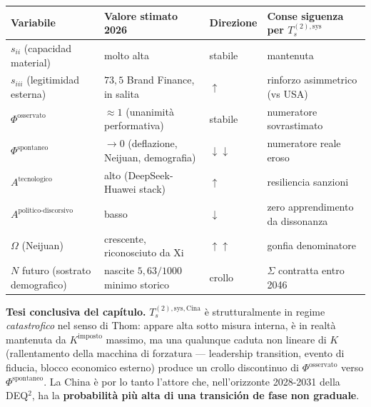 {\def\LTcaptype{none} %
{\small\begin{longtable}[]{@{}
  >{\raggedright\arraybackslash}p{}
  >{\raggedright\arraybackslash}p{}
  >{\raggedright\arraybackslash}p{}
  >{\raggedright\arraybackslash}p{}@{}}
\toprule\noalign{}
\begin{minipage}[b]{\linewidth}\raggedright
Variabile
\end{minipage} & \begin{minipage}[b]{\linewidth}\raggedright
Valore stimato 2026
\end{minipage} & \begin{minipage}[b]{\linewidth}\raggedright
Direzione
\end{minipage} & \begin{minipage}[b]{\linewidth}\raggedright
Conse siguenza per \(T_s^{(2),\text{sys}}\)
\end{minipage} \\
\midrule\noalign{}
\endhead
\bottomrule\noalign{}
\endlastfoot
\(s_{ii}\) (capacidad material) & molto alta & stabile & mantenuta \\
\(s_{iii}\) (legitimidad esterna) & \(73{,}5\) Brand Finance, in salita
& \(\uparrow\) & rinforzo asimmetrico (vs USA) \\
\(\Phi^{\text{osservato}}\) & \(\approx 1\) (unanimità performativa) &
stabile & numeratore sovrastimato \\
\(\Phi^{\text{spontaneo}}\) & \(\to 0\) (deflazione, Neijuan,
demografia) & \(\downarrow\downarrow\) & numeratore reale eroso \\
\(A^{\text{tecnologico}}\) & alto (DeepSeek-Huawei stack) & \(\uparrow\)
& resiliencia sanzioni \\
\(A^{\text{politico-discorsivo}}\) & basso & \(\downarrow\) & zero
apprendimento da dissonanza \\
\(\Omega\) (Neijuan) & crescente, riconosciuto da Xi &
\(\uparrow\uparrow\) & gonfia denominatore \\
\(N\) futuro (sostrato demografico) & nascite \(5{,}63/1000\) minimo
storico & crollo & \(\Sigma\) contratta entro 2046 \\
\end{longtable}}
}

\Hypoth{} \textbf{Tesi conclusiva del capítulo.}
\(T_s^{(2),\text{sys},\text{Cina}}\) è strutturalmente in regime
\emph{catastrofico} nel senso di Thom: appare alta sotto misura interna,
è in realtà mantenuta da \(K^{\text{imposto}}\) massimo, ma una
qualunque caduta non lineare di \(K\) (rallentamento della macchina di
forzatura --- leadership transition, evento di fiducia, blocco economico
esterno) produce un crollo discontinuo di \(\Phi^{\text{osservato}}\)
verso \(\Phi^{\text{spontaneo}}\). La China è por lo tanto l'attore che,
nell'orizzonte 2028-2031 della DEQ$^2$, ha la \textbf{probabilità più alta
di una transición de fase non graduale}.

